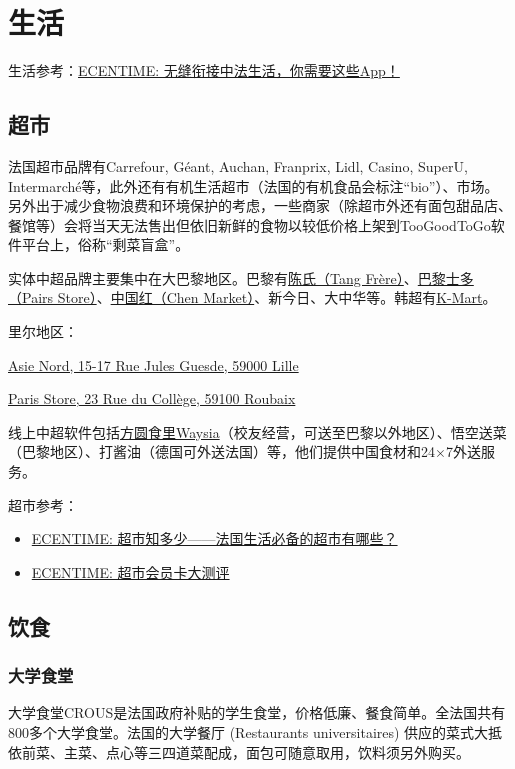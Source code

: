 \section{生活}
生活参考：\href{https://www.ecentime.com/article/liste-app}{ECENTIME: 无缝衔接中法生活，你需要这些App！}


\subsection{超市}
	
法国超市品牌有Carrefour, Géant, Auchan, Franprix, Lidl, Casino, SuperU, Intermarché等，此外还有有机生活超市（法国的有机食品会标注“bio”）、市场。另外出于减少食物浪费和环境保护的考虑，一些商家（除超市外还有面包甜品店、餐馆等）会将当天无法售出但依旧新鲜的食物以较低价格上架到TooGoodToGo软件平台上，俗称“剩菜盲盒”。

实体中超品牌主要集中在大巴黎地区。巴黎有\href{https://www.tang-freres.fr/}{陈氏（Tang Frère）}、\href{https://paris-store.com/}{巴黎士多（Pairs Store）}、\href{https://www.instagram.com/chenmarketfr/?hl=en}{中国红（Chen Market）}、新今日、大中华等。韩超有\href{https://www.instagram.com/kmartfrance/?hl=en}{K-Mart}。

里尔地区：

\href{https://maps.app.goo.gl/arekUkxV9KnKrmaj8}{Asie Nord, 15-17 Rue Jules Guesde, 59000 Lille}

\href{https://maps.app.goo.gl/4teSNmTntTzK39y36}{Paris Store, 23 Rue du Collège, 59100 Roubaix}

线上中超软件包括\href{https://mywaysia.com/en}{方圆食里Waysia}（校友经营，可送至巴黎以外地区）、悟空送菜（巴黎地区）、打酱油（德国可外送法国）等，他们提供中国食材和24$\times$7外送服务。

超市参考：
\begin{itemize}
    \item \href{https://www.ecentime.com/article/supermarket}{ECENTIME: 超市知多少——法国生活必备的超市有哪些？}
    \item \href{https://www.ecentime.com/article/ecentime-supermarketfrance}{ECENTIME: 超市会员卡大测评}
\end{itemize}


\subsection{饮食}

\subsubsection{大学食堂}
大学食堂CROUS是法国政府补贴的学生食堂，价格低廉、餐食简单。全法国共有800多个大学食堂。法国的大学餐厅 (Restaurants universitaires) 供应的菜式大抵依前菜、主菜、点心等三四道菜配成，面包可随意取用，饮料须另外购买。


